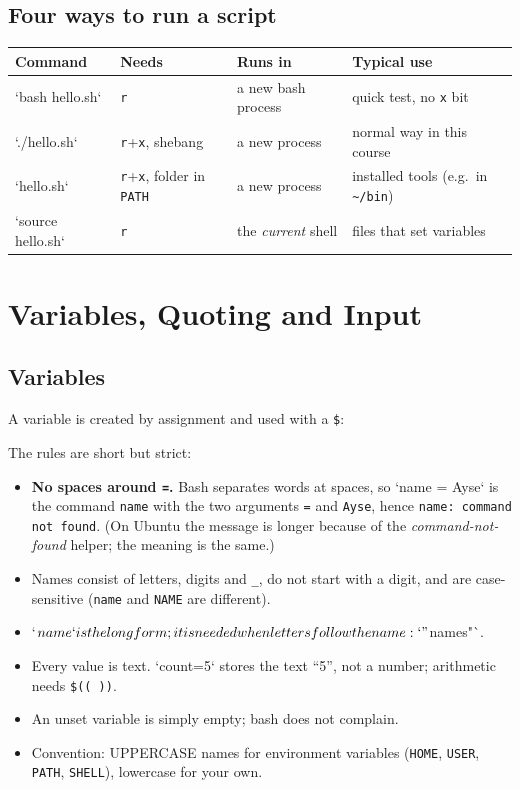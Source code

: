\documentclass[11pt,a4paper]{article}
\begin{document}
\subsection{Four ways to run a script}

\begin{center}
\small
\begin{tabular}{@{}llll@{}}
\toprule
\textbf{Command} & \textbf{Needs} & \textbf{Runs in} & \textbf{Typical use}\\
\midrule
`bash hello.sh` & \texttt{r} & a new bash process & quick test, no \texttt{x} bit\\
`./hello.sh` & \texttt{r}+\texttt{x}, shebang & a new process & normal way in this course\\
`hello.sh` & \texttt{r}+\texttt{x}, folder in \texttt{PATH} & a new process & installed tools (e.g.\ in \texttt{\textasciitilde/bin})\\
`source hello.sh` & \texttt{r} & the \emph{current} shell & files that set variables\\
\bottomrule
\end{tabular}
\end{center}

\section{Variables, Quoting and Input}

\subsection{Variables}

A variable is created by assignment and used with a \texttt{\$}:


The rules are short but strict:
\begin{itemize}
  \item \textbf{No spaces around \texttt{=}.} Bash separates words at spaces, so `name = Ayse` is the command \texttt{name} with the two arguments \texttt{=} and \texttt{Ayse}, hence \texttt{name: command not found}. (On Ubuntu the message is longer because of the \emph{command-not-found} helper; the meaning is the same.)
  \item Names consist of letters, digits and \texttt{\_}, do not start with a digit, and are case-sensitive (\texttt{name} and \texttt{NAME} are different).
  \item `${name}` is the long form; it is needed when letters follow the name: `"${name}s"`.
  \item Every value is text. `count=5` stores the text “5”, not a number; arithmetic needs \texttt{\$(( ))}.
  \item An unset variable is simply empty; bash does not complain.
  \item Convention: UPPERCASE names for environment variables (\texttt{HOME}, \texttt{USER}, \texttt{PATH}, \texttt{SHELL}), lowercase for your own.
\end{itemize}
\end{document}
